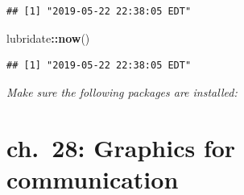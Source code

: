 \documentclass[]{book}
\newenvironment{Shaded}{\begin{snugshade}}{\end{snugshade}}
\newcommand{\KeywordTok}[1]{\textcolor[rgb]{0.13,0.29,0.53}{\textbf{#1}}}
\newcommand{\NormalTok}[1]{#1}
\newcommand{\OperatorTok}[1]{\textcolor[rgb]{0.81,0.36,0.00}{\textbf{#1}}}
\theoremstyle{definition}
\theoremstyle{definition}
\theoremstyle{definition}
\theoremstyle{remark}
\begin{document}
\begin{verbatim}
## [1] "2019-05-22 22:38:05 EDT"
\end{verbatim}

\begin{Shaded}
\begin{Highlighting}[]
\NormalTok{lubridate}\OperatorTok{::}\KeywordTok{now}\NormalTok{()}
\end{Highlighting}
\end{Shaded}

\begin{verbatim}
## [1] "2019-05-22 22:38:05 EDT"
\end{verbatim}

\emph{Make sure the following packages are installed:}

\hypertarget{ch.-28-graphics-for-communication}{%
\chapter{ch.~28: Graphics for
communication}\label{ch.-28-graphics-for-communication}}
\end{document}
